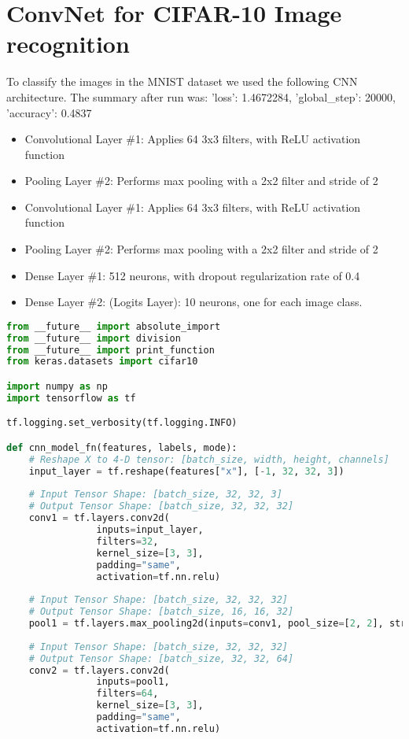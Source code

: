 \documentclass[letterpaper]{article}
\begin{document}
\begin{appendices}
\begin{lstlisting}[language=python]
\end{lstlisting}

\newpage
\section{ConvNet for CIFAR-10 Image recognition}

To classify the images in the MNIST dataset we used the following CNN architecture. The summary after run was: 'loss': 1.4672284, 'global\_step': 20000, 'accuracy': 0.4837

\begin{itemize}
	\item Convolutional Layer \#1: Applies 64 3x3 filters, with ReLU activation function
	\item Pooling Layer \#2: Performs max pooling with a 2x2 filter and stride of 2
	\item Convolutional Layer \#1: Applies 64 3x3 filters, with ReLU activation function
	\item Pooling Layer \#2: Performs max pooling with a 2x2 filter and stride of 2
	\item Dense Layer \#1: 512 neurons, with dropout regularization rate of 0.4
	\item Dense Layer \#2: (Logits Layer): 10 neurons, one for each image class.
\end{itemize}

\begin{lstlisting}[language=python]
from __future__ import absolute_import
from __future__ import division
from __future__ import print_function
from keras.datasets import cifar10

import numpy as np
import tensorflow as tf

tf.logging.set_verbosity(tf.logging.INFO)

def cnn_model_fn(features, labels, mode):
	# Reshape X to 4-D tensor: [batch_size, width, height, channels]
	input_layer = tf.reshape(features["x"], [-1, 32, 32, 3])
	
	# Input Tensor Shape: [batch_size, 32, 32, 3]
	# Output Tensor Shape: [batch_size, 32, 32, 32]
	conv1 = tf.layers.conv2d(
				inputs=input_layer,
				filters=32,
				kernel_size=[3, 3],
				padding="same",
				activation=tf.nn.relu)
	
	# Input Tensor Shape: [batch_size, 32, 32, 32]
	# Output Tensor Shape: [batch_size, 16, 16, 32]
	pool1 = tf.layers.max_pooling2d(inputs=conv1, pool_size=[2, 2], strides=2)
	
	# Input Tensor Shape: [batch_size, 32, 32, 32]
	# Output Tensor Shape: [batch_size, 32, 32, 64]
	conv2 = tf.layers.conv2d(
				inputs=pool1,
				filters=64,
				kernel_size=[3, 3],
				padding="same",
				activation=tf.nn.relu)
	

\end{lstlisting}
\end{appendices}
\end{document}
